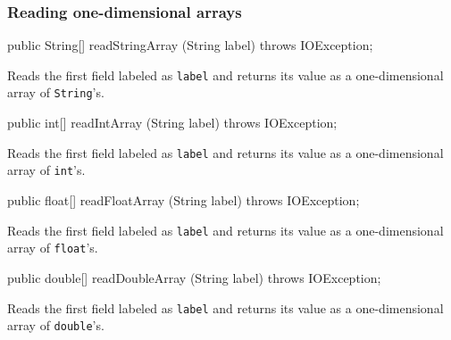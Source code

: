\subsubsection*{Reading one-dimensional arrays}
\begin{code}

   public String[] readStringArray (String label) throws IOException;
\end{code}
\begin{tabb}
Reads the first field labeled as \texttt{label} and returns its value as a one-dimensional array of \texttt{String}'s.
\end{tabb}
\begin{code}

   public int[] readIntArray (String label) throws IOException;
\end{code}
\begin{tabb}
Reads the first field labeled as \texttt{label} and returns its value as a one-dimensional array of \texttt{int}'s.
\end{tabb}
\begin{code}

   public float[] readFloatArray (String label) throws IOException;
\end{code}
\begin{tabb}
Reads the first field labeled as \texttt{label} and returns its value as a one-dimensional array of \texttt{float}'s.
\end{tabb}
\begin{code}

   public double[] readDoubleArray (String label) throws IOException;
\end{code}
\begin{tabb}
Reads the first field labeled as \texttt{label} and returns its value as a one-dimensional array of \texttt{double}'s.
\end{tabb}

